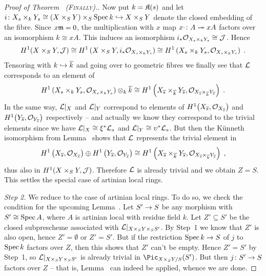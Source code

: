\documentclass[a4paper,parskip=half,numbers=enddot, DIV=12]{scrreprt}
\begin{document}
\begin{proof}[Proof of Theorem~ \textsc{(Finally)}.]
	Now put $k=\mathfrak{K}(s)$ and let $i\colon X_s\times_kY_s\cong (X\times_SY)\times_S\Spec k\monomorphism X\times_SY$ denote the closed embedding of the fibre. Since $x\mathfrak{m}=0$, the multiplication with $x$ map $x\cdot\colon A\epimorphism xA$ factors over an isomorphism $k\cong xA$. This induces an isomorphism $i_*\mathcal{O}_{X_s\times_kY_s}\cong \mathcal{J}$. Hence
	\begin{align*}
		H^1(X\times_SY,\mathcal{J})\cong H^1\left(X\times_SY,i_*\mathcal{O}_{X_s\times_kY_s}\right)\cong H^1\left(X_s\times_kY_s,\mathcal{O}_{X_s\times_kY_s}\right)\;.
	\end{align*}
	Tensoring with $k\monomorphism \ov{k}$ and going over to geometric fibres we finally see that $\mathcal{L}$ corresponds to an element of
	\begin{align*}
		H^1\left(X_s\times_kY_s,\mathcal{O}_{X_s\times_kY_s}\right)\otimes_k\overline{k}\cong H^1\left(X_{\overline{s}}\times_{\overline{k}}Y_{\overline{s}},\mathcal{O}_{X_{\overline{s}}\times_{\overline{k}}Y_{\overline{s}}}\right)\;.
	\end{align*}
	In the same way, $\mathcal{L}|_X$ and $\mathcal{L}|_Y$ correspond to elements of $H^1\big(X_{\overline{s}},\mathcal{O}_{X_{\overline{s}}}\big)$ and $H^1\big(Y_{\overline{s}},\mathcal{O}_{Y_{\overline{s}}}\big)$ respectively -- and actually we know they correspond to the trivial elements since we have $\mathcal{L}|_X\cong\xi^*\mathcal{L}_s$ and $\mathcal{L}|_Y\cong \upsilon^*\mathcal{L}_s$. But then the Künneth isomorphism from Lemma~ shows that $\mathcal{L}$ represents the trivial element in
	\begin{align*}
		H^1\left(X_{\overline{s}},\mathcal{O}_{X_{\overline{s}}}\right)\oplus H^1\left(Y_{\overline{s}},\mathcal{O}_{Y_{\overline{s}}}\right)\cong H^1\left(X_{\overline{s}}\times_{\overline{k}}Y_{\overline{s}},\mathcal{O}_{X_{\overline{s}}\times_{\overline{k}}Y_{\overline{s}}}\right)\;,
	\end{align*}
	thus also in $H^1(X\times_SY,\mathcal{J})$. Therefore $\mathcal{L}$ is already trivial and we obtain $Z=S$. This settles the special case of artinian local rings.
	
	\emph{Step 2.} We reduce to the case of artinian local rings. To do so, we check the condition for the upcoming Lemma~. Let $S'\morphism S$ be any morphism with $S'\cong \operatorname{Spec} A$, where $A$ is artinian local with residue field $k$. Let $Z'\subseteq S'$ be the closed subprescheme associated with $\mathcal{L}|_{X\times_SY\times_SS'}$. By Step~1 we know that $Z'$ is also open, hence $Z'=\emptyset$ or $Z'=S'$. But if the restriction $\Spec k\morphism S$ of $j$ to $\operatorname{Spec} k$ factors over $Z$, then this shows that $Z'$ can't be empty. Hence $Z'=S'$ by Step~1, so $\mathcal{L}|_{X\times_SY\times_SS'}$ is already trivial in $\Pic_{X\times_SY/S}(S')$. But then $j\colon S'\morphism S$ factors over $Z$ -- that is, Lemma~ can indeed be applied, whence we are done.
\end{proof}
\end{document}
